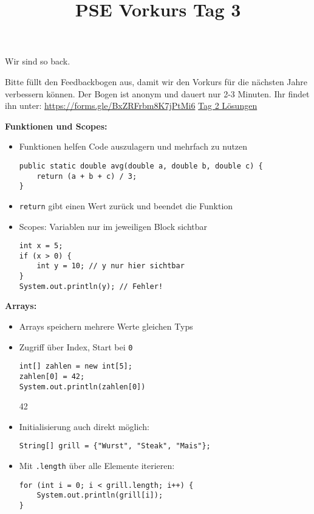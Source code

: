 \documentclass{../../sheet}
\title{PSE Vorkurs Tag 3}
\begin{document}
\maketitle
Wir sind so back.

Bitte füllt den Feedbackbogen aus, damit wir den Vorkurs für die nächsten Jahre verbessern können. Der Bogen ist anonym und dauert nur 2-3 Minuten. \newline Ihr findet ihn unter: \url{https://forms.gle/BxZRFrbm8K7jPtMi6}
\href{https://fius.de/wp-content/uploads/2025/10/Day2Musterloesung.zip}{Tag 2 Lösungen}

\textbf{Funktionen und Scopes:}
\begin{itemize}
    \item Funktionen helfen Code auszulagern und mehrfach zu nutzen
          \begin{verbatim}
public static double avg(double a, double b, double c) {
    return (a + b + c) / 3;
}
          \end{verbatim}
    \item \texttt{return} gibt einen Wert zurück und beendet die Funktion
    \item Scopes: Variablen nur im jeweiligen Block sichtbar
          \begin{verbatim}
int x = 5;
if (x > 0) {
    int y = 10; // y nur hier sichtbar
}
System.out.println(y); // Fehler!
          \end{verbatim}
\end{itemize}

\textbf{Arrays:}

\begin{itemize}
    \item Arrays speichern mehrere Werte gleichen Typs
    \item Zugriff über Index, Start bei \texttt{0}
          \begin{verbatim}
int[] zahlen = new int[5];
zahlen[0] = 42;
System.out.println(zahlen[0])
          \end{verbatim}
\begin{ausgabe}
42
\end{ausgabe}
    \item Initialisierung auch direkt möglich:
          \begin{verbatim}
String[] grill = {"Wurst", "Steak", "Mais"};
          \end{verbatim}
    \item Mit \texttt{.length} über alle Elemente iterieren:
          \begin{verbatim}
for (int i = 0; i < grill.length; i++) {
    System.out.println(grill[i]);
}
          \end{verbatim}
\end{itemize}
\end{document}
